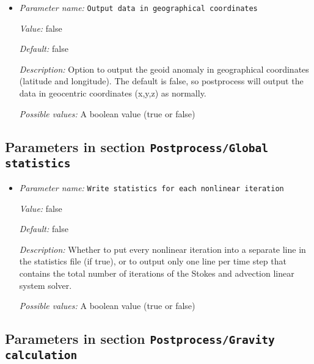 \begin{itemize}
{\it Possible values:} An integer $n$ such that $0\leq n \leq 2147483647$
\item {\it Parameter name:} {\tt Output data in geographical coordinates}
\label{parameters:Postprocess/Geoid/Output data in geographical coordinates}
\label{parameters:Postprocess/Geoid/Output_20data_20in_20geographical_20coordinates}


{\it Value:} false


{\it Default:} false


{\it Description:} Option to output the geoid anomaly in geographical coordinates (latitude and longitude). The default is false, so postprocess will output the data in geocentric coordinates (x,y,z) as normally.


{\it Possible values:} A boolean value (true or false)
\end{itemize}

\subsection{Parameters in section \tt Postprocess/Global statistics}
\label{parameters:Postprocess/Global_20statistics}

\begin{itemize}
\item {\it Parameter name:} {\tt Write statistics for each nonlinear iteration}
\label{parameters:Postprocess/Global statistics/Write statistics for each nonlinear iteration}
\label{parameters:Postprocess/Global_20statistics/Write_20statistics_20for_20each_20nonlinear_20iteration}


{\it Value:} false


{\it Default:} false


{\it Description:} Whether to put every nonlinear iteration into a separate line in the statistics file (if true), or to output only one line per time step that contains the total number of iterations of the Stokes and advection linear system solver.


{\it Possible values:} A boolean value (true or false)
\end{itemize}

\subsection{Parameters in section \tt Postprocess/Gravity calculation}
\label{parameters:Postprocess/Gravity_20calculation}

